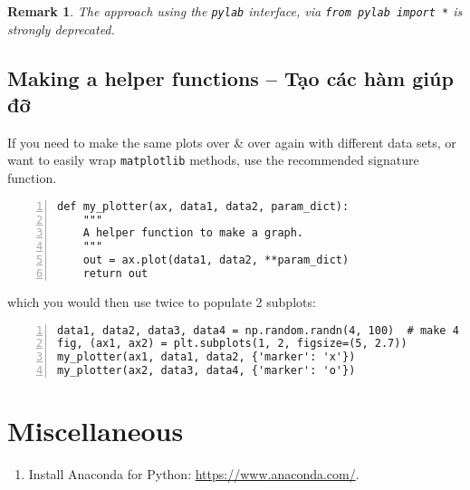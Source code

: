 \documentclass{article}
\newtheorem{remark}{Remark}
\begin{document}
\begin{remark}
    The approach using the {\tt pylab} interface, via {\tt from pylab import *} is strongly deprecated.
\end{remark}


\subsection{Making a helper functions -- Tạo các hàm giúp đỡ}
If you need to make the same plots over \& over again with different data sets, or want to easily wrap {\tt matplotlib} methods, use the recommended signature function.
\begin{Verbatim}[numbers=left,xleftmargin=5mm]
def my_plotter(ax, data1, data2, param_dict):
    """
    A helper function to make a graph.
    """
    out = ax.plot(data1, data2, **param_dict)
    return out
\end{Verbatim}
which you would then use twice to populate 2 subplots:
\begin{Verbatim}[numbers=left,xleftmargin=5mm]
data1, data2, data3, data4 = np.random.randn(4, 100)  # make 4 random data sets
fig, (ax1, ax2) = plt.subplots(1, 2, figsize=(5, 2.7))
my_plotter(ax1, data1, data2, {'marker': 'x'})
my_plotter(ax2, data3, data4, {'marker': 'o'})
\end{Verbatim}


\section{Miscellaneous}

\begin{enumerate}
	\item Install Anaconda for Python: \url{https://www.anaconda.com/}.
\end{enumerate}


\printbibliography[heading=bibintoc]
	
\end{document}
